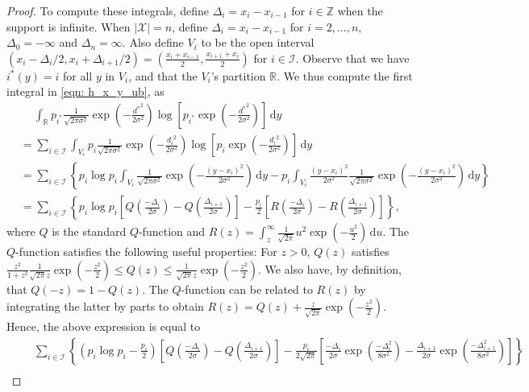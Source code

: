 \documentclass[11pt]{article}
\newcommand{\calI}{\mathcal{I}}
\newcommand{\calX}{\mathcal{X}}
\newcommand{\bbR}{\mathbb{R}}
\newcommand{\bbZ}{\mathbb{Z}}
\newcommand{\intR}{\int_{\bbR}}
\renewcommand{\d}{\,\mathrm{d}}
\begin{document}
\begin{proof}[Proof]
		To compute these integrals, define $\Delta_i = x_i - x_{i-1}$ for $i \in \bbZ$ when the support is infinite.  When $|\calX| = n$, define $\Delta_i = x_i - x_{i-1}$ for $i = 2,\dots,n$, $\Delta_0 = -\infty$ and $\Delta_n = \infty$.
		Also define $V_i$ to be the open interval $(x_i - \Delta_i/2, x_i + \Delta_{i+1}/2) = (\frac{x_i + x_{i-1}}{2}, \frac{x_{i+1} + x_{i}}{2})$ for $i \in \calI$. Observe that we have $i^*(y) = i$ for all $y$ in $V_i$, and that the $V_i$'s partition $\bbR$.
		We thus compute the first integral in \eqref{eqn: h_x_y_ub}, as
		\begin{align*}
			&\quad \ \intR p_{i^*} \tfrac{1}{\sqrt{2\pi \sigma^2}}\exp\left(-\tfrac{{d^*}^2}{2\sigma^2}\right) \log \left[p_{i^*} \exp\left(-\tfrac{{d^*}^2}{2\sigma^2}\right)\right]\d y\\
			&= \sum_{i \in \calI} \int_{V_i} p_{i} \tfrac{1}{\sqrt{2\pi \sigma^2}}\exp\left(-\tfrac{{d_i}^2}{2\sigma^2}\right) \log \left[p_{i} \exp\left(-\tfrac{{d_i}^2}{2\sigma^2}\right)\right]\d y\\
			&= \sum_{i \in \calI} \left\{ p_i\log p_i \int_{V_i}  \tfrac{1}{\sqrt{2\pi \sigma^2}}\exp\left(-\tfrac{(y-x_i)^2}{2\sigma^2}\right) \d y - p_i\int_{V_i} \frac{(y-x_i)^2}{2\sigma^2}\tfrac{1}{\sqrt{2\pi \sigma^2}}\exp\left(-\tfrac{(y-x_i)^2}{2\sigma^2}\right) \d y \right\}\\
			&= \sum_{i \in \calI} \left\{ p_i\log p_i \left[Q\left(\tfrac{-\Delta_i}{2\sigma}\right)-Q\left(\tfrac{\Delta_{i+1}}{2\sigma}\right)\right] - \frac{p_i}{2}\left[R\left(\tfrac{-\Delta_i}{2\sigma}\right)-R\left(\tfrac{\Delta_{i+1}}{2\sigma}\right)\right] \right\},
		\end{align*}
		where $Q$ is the standard $Q$-function and $R(z) = \int_z^{\infty} \frac1{\sqrt{2\pi}}u^2\exp(-\frac{u^2}{2}) \d u$.
		The $Q$-function satisfies the following useful properties: For $z > 0$, $Q(z)$ satisfies $\frac{z^2}{1+z^2} \frac{1}{\sqrt{2\pi}z}\exp(-\frac{z^2}{2}) \leq Q(z) \leq \frac{1}{\sqrt{2\pi}z}\exp(-\frac{z^2}{2})$. We also have, by definition, that $Q(-z) = 1-Q(z)$.
		The $Q$-function can be related to $R(z)$ by integrating the latter by parts to obtain $R(z) = Q(z) + \frac{z}{\sqrt{2\pi}}\exp(-\frac{z^2}{2})$. Hence, the above expression is equal to 
		\begin{align*}
			&\quad \ \sum_{i \in \calI} \left\{ \left(p_i\log p_i-\tfrac{p_i}{2}\right) \left[Q\left(\tfrac{-\Delta_i}{2\sigma}\right)-Q\left(\tfrac{\Delta_{i+1}}{2\sigma}\right)\right] - \tfrac{p_i}{2\sqrt{2\pi}}\left[\tfrac{-\Delta_i}{2\sigma}\exp\left(\tfrac{-\Delta_i^2}{8\sigma^2}\right)-\tfrac{\Delta_{i+1}}{2\sigma}\exp\left(\tfrac{-\Delta_{i+1}^2}{8\sigma^2}\right)\right] \right\} \\ 

\end{align*}
\end{proof}
\end{document}
